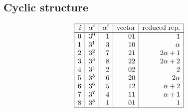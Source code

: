 \documentclass[12pt]{article}
\begin{document}
{\subsection*{Cyclic structure}
$$
\begin{array}{|r|r|r|r|r|}
\hline
i & \alpha^i & \alpha^i & \mbox{vector}& \mbox{reduced rep.}\\
\hline
0 & 3^{0} & 1 & 01 &   1\\
1 & 3^{1} & 3 & 10 & \alpha\\
2 & 3^{2} & 7 & 21 &   2\alpha +   1\\
3 & 3^{3} & 8 & 22 &   2\alpha +   2\\
4 & 3^{4} & 2 & 02 &   2\\
5 & 3^{5} & 6 & 20 &   2\alpha\\
6 & 3^{6} & 5 & 12 & \alpha +   2\\
7 & 3^{7} & 4 & 11 & \alpha +   1\\
8 & 3^{8} & 1 & 01 &   1\\
\hline
\end{array}
$$
}
\end{document}
